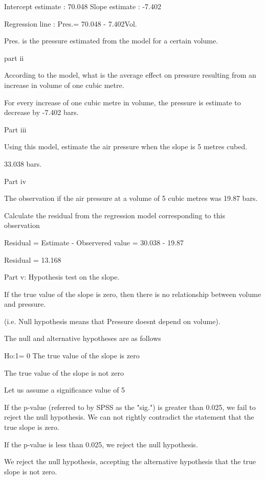 Intercept estimate :	 70.048
Slope estimate :         -7.402
 
Regression line  : Pres.= 70.048 - 7.402Vol. 

Pres.  is the pressure estimated from the model for a certain volume. 
 
 

 
part ii
 
According to the model, what is the average effect on pressure resulting from an increase in volume of one cubic metre.
 
 
For every increase of one cubic metre in volume, the pressure is estimate to decrease by -7.402  bars.

 
Part iii
 
Using this model, estimate the air pressure when the slope is 5 metres cubed.
 
		33.038 bars.
 
Part iv
 
The observation if the air pressure at a volume of 5 cubic metres was 19.87 bars.
 
Calculate the residual from the regression model corresponding to this observation
 
Residual = Estimate - Observered value = 30.038 - 19.87
 
Residual = 13.168 
 
Part v: Hypothesis test on the slope.
 
 
If the true value of the slope is zero, then there is no relationship between volume and pressure.
 
(i.e. Null hypothesis means that Pressure doesnt depend on volume).
 
 
The null and alternative hypotheses are as follows
 
Ho:1= 0  	 The true value of the slope is zero
 
 
		The true value of the slope is not zero
 
 
Let us assume a significance value of 5%
 
If the p-value (referred to by SPSS as the "sig.") is greater than 0.025, we fail to reject the null hypothesis. We can not rightly contradict the statement that the true slope is zero.
 
If the p-value is less than 0.025, we reject the null hypothesis.
 
We reject the null hypothesis, accepting the alternative hypothesis that the true slope is not zero.
 
